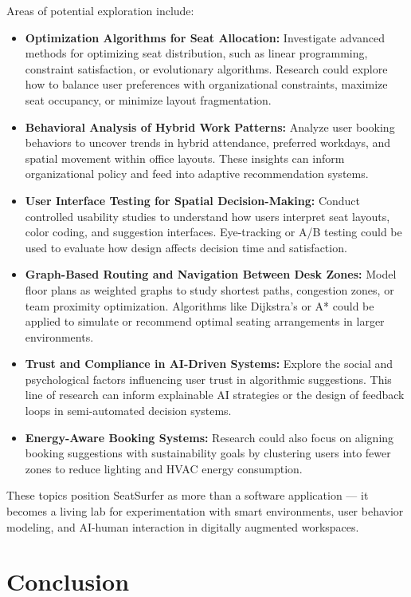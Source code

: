 \documentclass[12pt,a4paper]{report} %
\begin{document}
Areas of potential exploration include:

\begin{itemize}
\item \textbf{Optimization Algorithms for Seat Allocation:}
Investigate advanced methods for optimizing seat distribution, such as linear programming, constraint satisfaction, or evolutionary algorithms. Research could explore how to balance user preferences with organizational constraints, maximize seat occupancy, or minimize layout fragmentation.
\item \textbf{Behavioral Analysis of Hybrid Work Patterns:}  
Analyze user booking behaviors to uncover trends in hybrid attendance, preferred workdays, and spatial movement within office layouts. These insights can inform organizational policy and feed into adaptive recommendation systems.
\item \textbf{User Interface Testing for Spatial Decision-Making:}  
Conduct controlled usability studies to understand how users interpret seat layouts, color coding, and suggestion interfaces. Eye-tracking or A/B testing could be used to evaluate how design affects decision time and satisfaction.
\item \textbf{Graph-Based Routing and Navigation Between Desk Zones:}  
Model floor plans as weighted graphs to study shortest paths, congestion zones, or team proximity optimization. Algorithms like Dijkstra's or A* could be applied to simulate or recommend optimal seating arrangements in larger environments.
\item \textbf{Trust and Compliance in AI-Driven Systems:}  
Explore the social and psychological factors influencing user trust in algorithmic suggestions. This line of research can inform explainable AI strategies or the design of feedback loops in semi-automated decision systems.
\item \textbf{Energy-Aware Booking Systems:}  
Research could also focus on aligning booking suggestions with sustainability goals by clustering users into fewer zones to reduce lighting and HVAC energy consumption.
\end{itemize}

These topics position SeatSurfer as more than a software application — it becomes a living lab for experimentation with smart environments, user behavior modeling, and AI-human interaction in digitally augmented workspaces.

\section{Conclusion}
\end{document}
